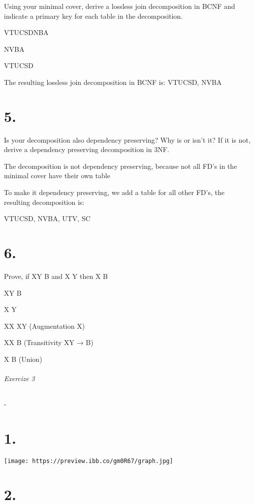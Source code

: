 \documentclass{article}
\begin{document}
Using your minimal cover, derive a lossless join decomposition in BCNF and indicate a primary key for each table in the decomposition.
\newline

VTUCSDNBA

\Downarrow \> \Rightarrow NVBA

VTUCSD
	  
	The resulting lossless join decomposition in BCNF is: VTUCSD, NVBA

\chapter{5.}

Is your decomposition also dependency preserving? Why is or isn’t it? If it is not, derive a dependency preserving decomposition in 3NF.
\newline

The decomposition is not dependency preserving, because not all FD’s in the minimal cover have their own table


To make it dependency preserving, we add a table for all other FD’s, the resulting decomposition is:


VTUCSD, NVBA, UTV, SC

\chapter{6.}

Prove, if XY \rightarrow B and X \rightarrow Y then X \rightarrow B

	XY \rightarrow B
	
	X \rightarrow Y
	
	XX \rightarrow XY								(Augmentation X)
	
	XX \rightarrow B									(Transitivity XY → B)
	
	X \rightarrow B									(Union)	


\newline

\subparagraph*{Exercize 3}
-

\chapter{1.}

\texttt{[image: https://preview.ibb.co/gm0R67/graph.jpg]}

\chapter{2.}
\end{document}
